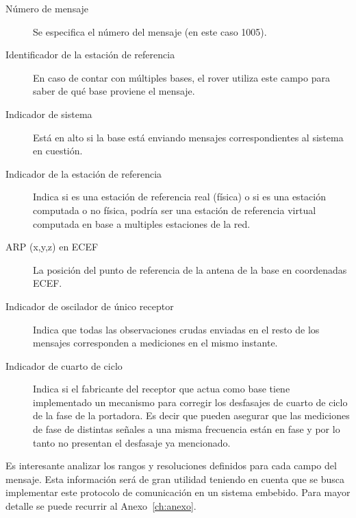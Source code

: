 \documentclass[a4paper,12pt,oneside,onecolumn,final,openright]{book}%
\begin{document}

\begin{description}
	\item[Número de mensaje] Se especifica el número del mensaje (en este caso 1005).
	\item[Identificador de la estación de referencia] En caso de contar con múltiples bases, el rover utiliza este campo para saber de qué base proviene el mensaje.
	\item[Indicador de sistema] Está en alto si la base está enviando mensajes correspondientes al sistema en cuestión.
	\item[Indicador de la estación de referencia] Indica si es una estación de referencia real (física) o si es una estación computada o no física, podría ser una estación de referencia virtual computada en base a multiples estaciones de la red.
	\item[ARP (x,y,z) en ECEF] La posición del punto de referencia de la antena de la base en coordenadas ECEF.
	\item [Indicador de oscilador de único receptor] Indica que todas las observaciones crudas enviadas en el resto de los mensajes corresponden a mediciones en el mismo instante.
	\item[Indicador de cuarto de ciclo] Indica si el fabricante del receptor que actua como base tiene implementado un mecanismo para corregir los desfasajes de cuarto de ciclo de la fase de la portadora. Es decir que pueden asegurar que las mediciones de fase de distintas señales a una misma frecuencia están en fase y por lo tanto no presentan el desfasaje ya mencionado.
\end{description}
	
	Es interesante analizar los rangos y resoluciones definidos para cada campo del mensaje. Esta información será de gran utilidad teniendo en cuenta que se busca implementar este protocolo de comunicación en un sistema embebido. Para mayor detalle se puede recurrir al Anexo~\ref{ch:anexo}.
	
\end{document}
